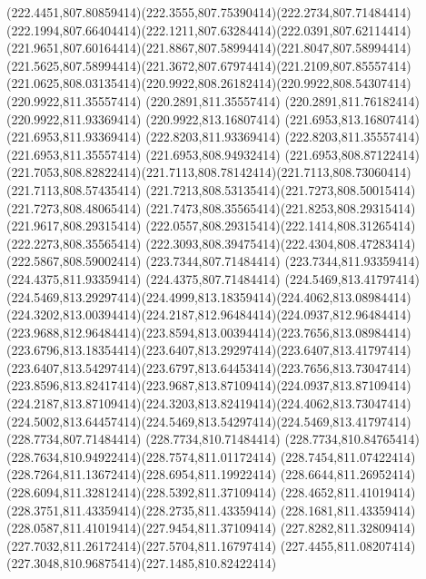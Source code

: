 {{	\curveto(222.4451,807.80859414)(222.3555,807.75390414)(222.2734,807.71484414)
	\curveto(222.1994,807.66404414)(222.1211,807.63284414)(222.0391,807.62114414)
	\curveto(221.9651,807.60164414)(221.8867,807.58994414)(221.8047,807.58994414)
	\curveto(221.5625,807.58994414)(221.3672,807.67974414)(221.2109,807.85557414)
	\curveto(221.0625,808.03135414)(220.9922,808.26182414)(220.9922,808.54307414)
	\lineto(220.9922,811.35557414)
	\lineto(220.2891,811.35557414)
	\lineto(220.2891,811.76182414)
	\lineto(220.9922,811.93369414)
	\lineto(220.9922,813.16807414)
	\lineto(221.6953,813.16807414)
	\lineto(221.6953,811.93369414)
	\lineto(222.8203,811.93369414)
	\lineto(222.8203,811.35557414)
	\lineto(221.6953,811.35557414)
	\lineto(221.6953,808.94932414)
	\lineto(221.6953,808.87122414)
	\curveto(221.7053,808.82822414)(221.7113,808.78142414)(221.7113,808.73060414)
	\lineto(221.7113,808.57435414)
	\curveto(221.7213,808.53135414)(221.7273,808.50015414)(221.7273,808.48065414)
	\curveto(221.7473,808.35565414)(221.8253,808.29315414)(221.9617,808.29315414)
	\curveto(222.0557,808.29315414)(222.1414,808.31265414)(222.2273,808.35565414)
	\curveto(222.3093,808.39475414)(222.4304,808.47283414)(222.5867,808.59002414)
	\closepath
	\moveto(223.7344,807.71484414)
	\lineto(223.7344,811.93359414)
	\lineto(224.4375,811.93359414)
	\lineto(224.4375,807.71484414)
	\closepath
	\moveto(224.5469,813.41797414)
	\curveto(224.5469,813.29297414)(224.4999,813.18359414)(224.4062,813.08984414)
	\curveto(224.3202,813.00394414)(224.2187,812.96484414)(224.0937,812.96484414)
	\curveto(223.9688,812.96484414)(223.8594,813.00394414)(223.7656,813.08984414)
	\curveto(223.6796,813.18354414)(223.6407,813.29297414)(223.6407,813.41797414)
	\curveto(223.6407,813.54297414)(223.6797,813.64453414)(223.7656,813.73047414)
	\curveto(223.8596,813.82417414)(223.9687,813.87109414)(224.0937,813.87109414)
	\curveto(224.2187,813.87109414)(224.3203,813.82419414)(224.4062,813.73047414)
	\curveto(224.5002,813.64457414)(224.5469,813.54297414)(224.5469,813.41797414)
	\closepath
	\moveto(228.7734,807.71484414)
	\lineto(228.7734,810.71484414)
	\curveto(228.7734,810.84765414)(228.7634,810.94922414)(228.7574,811.01172414)
	\curveto(228.7454,811.07422414)(228.7264,811.13672414)(228.6954,811.19922414)
	\curveto(228.6644,811.26952414)(228.6094,811.32812414)(228.5392,811.37109414)
	\curveto(228.4652,811.41019414)(228.3751,811.43359414)(228.2735,811.43359414)
	\curveto(228.1681,811.43359414)(228.0587,811.41019414)(227.9454,811.37109414)
	\curveto(227.8282,811.32809414)(227.7032,811.26172414)(227.5704,811.16797414)
	\curveto(227.4455,811.08207414)(227.3048,810.96875414)(227.1485,810.82422414)
}}
